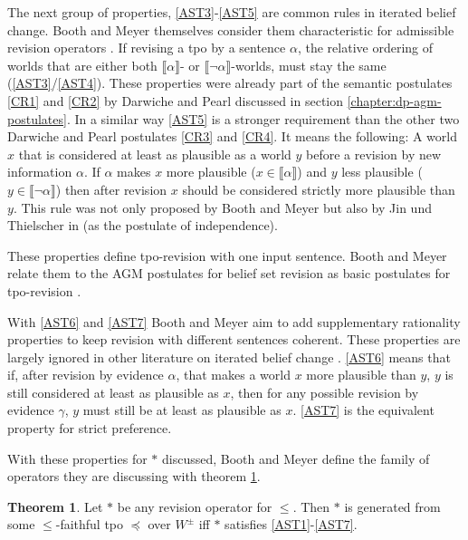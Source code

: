 \documentclass[english, 12pt]{scrartcl}
\theoremstyle{definition}
\theoremstyle{definition}
\theoremstyle{definition}
\newtheorem{theorem}{Theorem}
\newcommand{\modelsOf}[1]{\llbracket #1 \rrbracket}
\begin{document}
The next group of properties, \ref{AST3}-\ref{AST5} are common rules in iterated belief change. Booth and Meyer themselves consider them characteristic for admissible revision operators \cite{Booth2006a}.
If revising a tpo by a sentence $\alpha$, the relative ordering of worlds that are either both $\modelsOf{\alpha}$- or $\modelsOf{\neg\alpha}$-worlds, must stay the same (\ref{AST3}/\ref{AST4}). These properties were already part of the semantic postulates \ref{CR1} and \ref{CR2} by Darwiche and Pearl \cite{Darwiche1997} discussed in section \ref{chapter:dp-agm-postulates}.
In a similar way \ref{AST5} is a stronger requirement than the other two Darwiche and Pearl postulates \ref{CR3} and \ref{CR4}. It means the following: A world $x$ that is considered at least as plausible as a world $y$ before a revision by new information $\alpha$. If $\alpha$ makes $x$ more plausible ($x \in \modelsOf{\alpha}$) and $y$ less plausible ($y \in \modelsOf{\neg\alpha}$) then after revision $x$ should be considered strictly more plausible than $y$. This rule was not only proposed by Booth and Meyer \cite{Booth2006a} but also by Jin und Thielscher in \cite{Jin2007} (as the postulate of independence).


These properties define tpo-revision with one input sentence. Booth and Meyer relate them to the AGM postulates for belief set revision \cite{Alchourron1985} as basic postulates for tpo-revision \cite{Booth2011}.

With \ref{AST6} and \ref{AST7} Booth and Meyer aim to add supplementary rationality properties to keep revision with different sentences coherent. These properties are largely ignored in other literature on iterated belief change \cite{Booth2011}. \ref{AST6} means that if, after revision by evidence $\alpha$, that makes a world $x$ more plausible than $y$, $y$ is still considered at least as plausible as $x$, then for any possible revision by evidence $\gamma$, $y$ must still be at least as plausible as $x$. \ref{AST7} is the equivalent property for strict preference.

\bigskip

With these properties for $\ast$ discussed, Booth and Meyer define the family of operators they are discussing with theorem \ref{theorem:revision-operator}.

\begin{theorem}
\label{theorem:revision-operator}Let $\ast$ be any revision operator for $\leq$. Then $\ast$ is generated from some $\leq$-faithful tpo $\preceq$ over $W^{\pm}$ iff $\ast$ satisfies \ref{AST1}-\ref{AST7}. \cite{Booth2011}
\end{theorem}
\end{document}
